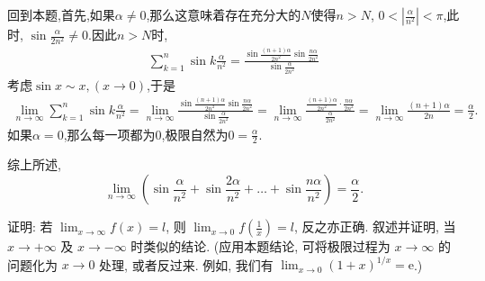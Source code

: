 \begin{solution}
    回到本题,首先,如果$\alpha\neq 0$,那么这意味着存在充分大的$N$使得$n>N$, $0<\left|\frac{\alpha}{n^2}\right|<\pi$,此时, $\sin \frac{\alpha}{2n^2} \neq 0$.因此$n>N$时,
    \begin{align*}
        \sum_{k=1}^n \sin k \frac{\alpha}{n^2} =  \frac{\sin\frac{(n+1)\alpha}{2n^2}\sin\frac{n\alpha}{2n^2}}{\sin \frac{\alpha}{2n^2}}
    \end{align*}
    考虑$\sin x \sim x , (x \to 0)$,于是
    \begin{align*}
        \lim_{n\to\infty}\sum_{k=1}^n \sin k \frac{\alpha}{n^2}
        =\lim_{n \to \infty} \frac{\sin\frac{(n+1)\alpha}{2n^2}\sin\frac{n\alpha}{2n^2}}{\sin \frac{\alpha}{2n^2}}
        =\lim_{n \to \infty} \frac{\frac{(n+1)\alpha}{2n^2}
            \cdot\frac{n\alpha}{2n^2}}{\frac{\alpha}{2n^2}}  =\lim_{n \to \infty} \frac{(n+1)\alpha}{2n}  = \frac{\alpha}{2}.
    \end{align*}
    如果$\alpha = 0$,那么每一项都为$0$,极限自然为$0=\frac{\alpha}{2}$.

    综上所述, $$\lim_{n \to \infty} \left(\sin\frac{\alpha}{n^2} + \sin\frac{2\alpha}{n^2} + \dots + \sin\frac{n\alpha}{n^2}\right) = \frac{\alpha}{2}.$$

\end{solution}

\begin{exercise}[1.3.8]
    证明: 若 $\lim_{x \to \infty} f(x) = l$, 则 $\lim_{x \to 0} f\left(\frac{1}{x}\right)=l$, 反之亦正确. 叙述并证明, 当 $x \to +\infty$ 及 $x \to -\infty$ 时类似的结论. (应用本题结论, 可将极限过程为 $x \to \infty$ 的问题化为 $x \to 0$ 处理, 或者反过来. 例如, 我们有 $\lim_{x \to 0} (1+x)^{1/x} = \mathrm{e}$.)
\end{exercise}

